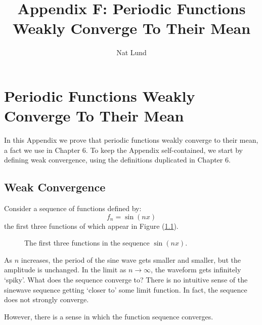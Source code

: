 \documentclass[12pt, a4paper, twoside, openright]{book}
\title{Appendix F: Periodic Functions Weakly Converge To Their Mean}
\author{Nat Lund}
\begin{document}
\chapter{Periodic Functions Weakly Converge To Their Mean}\label{C:weakconvergence}

In this Appendix we prove that periodic functions weakly converge to their mean, a fact we use in Chapter 6.  To keep the Appendix self-contained, we start by defining weak convergence, using the definitions duplicated in Chapter 6.

\clearpage
\section{Weak Convergence}

Consider a sequence of functions defined by:
\begin{equation}
f_n = \sin(n x)
\end{equation}
the first three functions of which appear in Figure (\ref{sinnx}).
\begin{figure}[ht]
\centering
{}
\caption{The first three functions in the sequence $\sin (n x)$.}\label{sinnx}
\end{figure}

As $n$ increases, the period of the sine wave gets smaller and smaller, but the amplitude is unchanged.  In the limit as $n \to \infty$, the waveform gets infinitely `spiky'.  What does the sequence converge to?  There is no intuitive sense of the sinewave sequence getting `closer to' some limit function.  In fact, the sequence does not strongly converge.

However, there is a sense in which the function sequence converges. 
\end{document}
